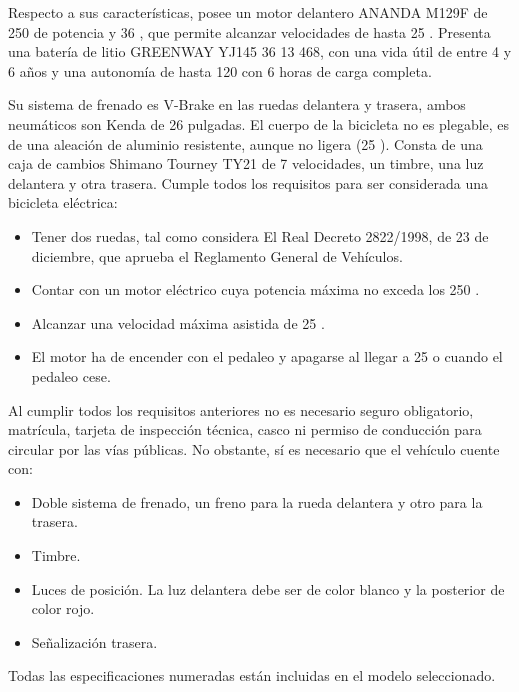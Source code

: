 Respecto a sus características, posee un motor delantero ANANDA M129F de 250  de potencia y 36 , que permite alcanzar velocidades de hasta 25 . Presenta una batería de litio GREENWAY YJ145 36 13 468, con una vida útil de entre 4 y 6 años y una autonomía de hasta 120  con 6 horas de carga completa. 

Su sistema de frenado es V-Brake en las ruedas delantera y trasera, ambos neumáticos son Kenda de 26 pulgadas. El cuerpo de la bicicleta no es plegable, es de una aleación de aluminio resistente, aunque no ligera (25 ). Consta de una caja de cambios Shimano Tourney TY21 de 7 velocidades, un timbre, una luz delantera y otra trasera. 
Cumple todos los requisitos para ser considerada una bicicleta eléctrica:

\begin{itemize}
\item Tener dos ruedas, tal como considera El Real Decreto 2822/1998, de 23 de diciembre, que aprueba el Reglamento General de Vehículos.\cite{boe2822}
\item Contar con un motor eléctrico cuya potencia máxima no exceda los 250 .
\item Alcanzar una velocidad máxima asistida de 25 .
\item El motor ha de encender con el pedaleo y apagarse al llegar a 25  o cuando el pedaleo cese.
\end{itemize}

Al cumplir todos los requisitos anteriores no es necesario seguro obligatorio, matrícula, tarjeta de inspección técnica, casco ni permiso de conducción para circular por las vías públicas. No obstante, sí es necesario que el vehículo cuente con:


\begin{itemize}
\item Doble sistema de frenado, un freno para la rueda delantera y otro para la trasera.
\item Timbre. 
\item Luces de posición. La luz delantera debe ser de color blanco y la posterior de color rojo.
\item Señalización trasera.
\end{itemize}

Todas las especificaciones numeradas están incluidas en el modelo seleccionado.

